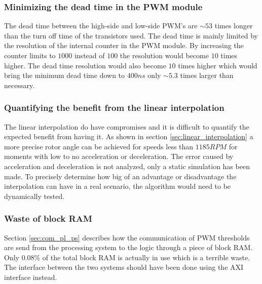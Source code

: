 \subsubsection{Minimizing the dead time in the PWM module}
The dead time between the high-side and low-side PWM's are $\sim 53$ times longer than the turn off time of the transistors used. The dead time is mainly limited by the resolution of the internal counter in the PWM module. By increasing the counter limits to $1000$ instead of $100$ the resolution would become $10$ times higher. The dead time resolution would also become $10$ times higher which would bring the minimum dead time down to $400ns$ only $\sim 5.3$ times larger than necessary.

\subsubsection{Quantifying the benefit from the linear interpolation}
The linear interpolation do have compromises and it is difficult to quantify the expected benefit from having it. As shown in section \ref{sec:linear_interpolation} a more precise rotor angle can be achieved for speeds less than $1185RPM$ for moments with low to no acceleration or deceleration. The error caused by acceleration and deceleration is not analyzed, only a static simulation has been made. To precisely determine how big of an advantage or disadvantage the interpolation can have in a real scenario, the algorithm would need to be dynamically tested.

\subsubsection{Waste of block RAM}
Section \ref{sec:com_pl_ps} describes how the communication of PWM thresholds are send from the processing system to the logic through a piece of block RAM. Only $0.08\%$ of the total block RAM is actually in use which is a terrible waste. The interface between the two systems should have been done using the AXI interface instead.


 
 